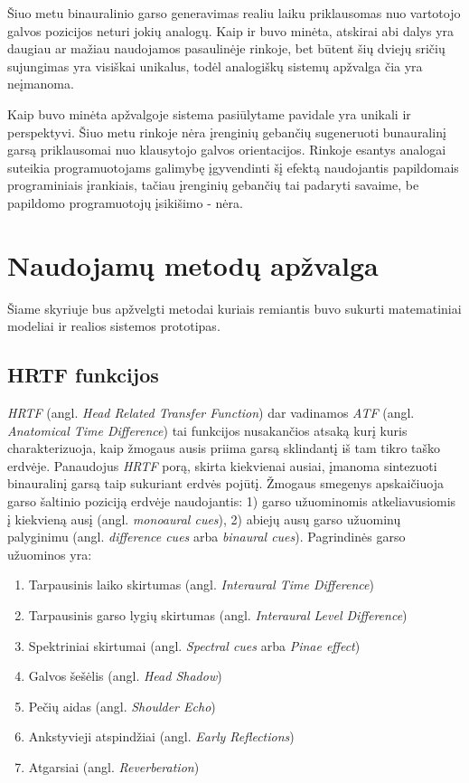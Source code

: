 \documentclass[]{vgtuef}
\begin{document}
Šiuo metu binauralinio garso generavimas realiu laiku priklausomas nuo vartotojo galvos pozicijos neturi jokių analogų. Kaip ir buvo minėta, atskirai abi dalys yra daugiau ar mažiau naudojamos pasaulinėje rinkoje, bet būtent šių dviejų sričių sujungimas yra visiškai unikalus, todėl analogiškų sistemų apžvalga čia yra neįmanoma.

Kaip buvo minėta apžvalgoje sistema pasiūlytame pavidale yra unikali ir perspektyvi. Šiuo metu rinkoje nėra įrenginių gebančių sugeneruoti bunauralinį garsą priklausomai nuo klausytojo galvos orientacijos. Rinkoje esantys analogai suteikia programuotojams galimybę įgyvendinti šį efektą naudojantis papildomais programiniais įrankiais, tačiau įrenginių gebančių tai padaryti savaime, be papildomo programuotojų įsikišimo - nėra.

\section{Naudojamų metodų apžvalga}

Šiame skyriuje bus apžvelgti metodai kuriais remiantis buvo sukurti matematiniai modeliai ir realios sistemos prototipas.

\subsection{HRTF funkcijos}

\textit{HRTF} (angl. \textit{Head Related Transfer Function}) dar vadinamos \textit{ATF} (angl. \textit{Anatomical Time Difference}) tai funkcijos nusakančios atsaką kurį kuris charakterizuoja, kaip žmogaus ausis priima garsą sklindantį iš tam tikro taško erdvėje. Panaudojus \textit{HRTF} porą, skirta kiekvienai ausiai, įmanoma sintezuoti binauralinį garsą taip sukuriant erdvės pojūtį.  
Žmogaus smegenys apskaičiuoja garso šaltinio poziciją erdvėje naudojantis: 1) garso užuominomis atkeliavusiomis į kiekvieną ausį (angl. \textit{monoaural cues}), 2) abiejų ausų garso užuominų palyginimu (angl. \textit{difference cues} arba \textit{binaural cues}). Pagrindinės garso užuominos yra:
\begin{enumerate}
\item Tarpausinis laiko skirtumas (angl. \textit{Interaural Time Difference})
\item Tarpausinis garso lygių skirtumas (angl. \textit{Interaural Level Difference})
\item Spektriniai skirtumai (angl. \textit{Spectral cues} arba \textit{Pinae effect})
\item Galvos šešėlis (angl. \textit{Head Shadow})
\item Pečių aidas (angl. \textit{Shoulder Echo})
\item Ankstyvieji atspindžiai (angl. \textit{Early Reflections})
\item Atgarsiai (angl. \textit{Reverberation})
\end{enumerate}
\end{document}

